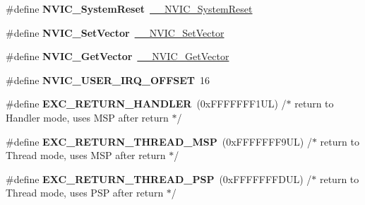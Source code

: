 \begin{DoxyCompactItemize}
\#define {\bfseries N\+V\+I\+C\+\_\+\+System\+Reset}~\mbox{\hyperlink{group___c_m_s_i_s___core___n_v_i_c_functions_ga0d9aa2d30fa54b41eb780c16e35b676c}{\+\_\+\+\_\+\+N\+V\+I\+C\+\_\+\+System\+Reset}}
\item 
\mbox{\label{group___c_m_s_i_s___core___n_v_i_c_functions_ga804af63bb4c4c317387897431814775d}} 
\#define {\bfseries N\+V\+I\+C\+\_\+\+Set\+Vector}~\mbox{\hyperlink{group___c_m_s_i_s___core___n_v_i_c_functions_ga0df355460bc1783d58f9d72ee4884208}{\+\_\+\+\_\+\+N\+V\+I\+C\+\_\+\+Set\+Vector}}
\item 
\mbox{\label{group___c_m_s_i_s___core___n_v_i_c_functions_ga955eb1c33a3dcc62af11a8385e8c0fc8}} 
\#define {\bfseries N\+V\+I\+C\+\_\+\+Get\+Vector}~\mbox{\hyperlink{group___c_m_s_i_s___core___n_v_i_c_functions_ga44b665d2afb708121d9b10c76ff00ee5}{\+\_\+\+\_\+\+N\+V\+I\+C\+\_\+\+Get\+Vector}}
\item 
\mbox{\label{group___c_m_s_i_s___core___n_v_i_c_functions_ga8045d905a5ca57437d8e6f71ffcb6df5}} 
\#define {\bfseries N\+V\+I\+C\+\_\+\+U\+S\+E\+R\+\_\+\+I\+R\+Q\+\_\+\+O\+F\+F\+S\+ET}~16
\item 
\mbox{\label{group___c_m_s_i_s___core___n_v_i_c_functions_gaa6fa2b10f756385433e08522d9e4632f}} 
\#define {\bfseries E\+X\+C\+\_\+\+R\+E\+T\+U\+R\+N\+\_\+\+H\+A\+N\+D\+L\+ER}~(0x\+F\+F\+F\+F\+F\+F\+F1\+U\+L)     /$\ast$ return to Handler mode, uses M\+S\+P after return                               $\ast$/
\item 
\mbox{\label{group___c_m_s_i_s___core___n_v_i_c_functions_gaea4703101b5e679f695e231f7ee72331}} 
\#define {\bfseries E\+X\+C\+\_\+\+R\+E\+T\+U\+R\+N\+\_\+\+T\+H\+R\+E\+A\+D\+\_\+\+M\+SP}~(0x\+F\+F\+F\+F\+F\+F\+F9\+U\+L)     /$\ast$ return to Thread mode, uses M\+S\+P after return                                $\ast$/
\item 
\mbox{\label{group___c_m_s_i_s___core___n_v_i_c_functions_ga9998daf0fbdf31dbc8f81cd604b58175}} 
\#define {\bfseries E\+X\+C\+\_\+\+R\+E\+T\+U\+R\+N\+\_\+\+T\+H\+R\+E\+A\+D\+\_\+\+P\+SP}~(0x\+F\+F\+F\+F\+F\+F\+F\+D\+U\+L)     /$\ast$ return to Thread mode, uses P\+S\+P after return                                $\ast$/

\end{DoxyCompactItemize}

